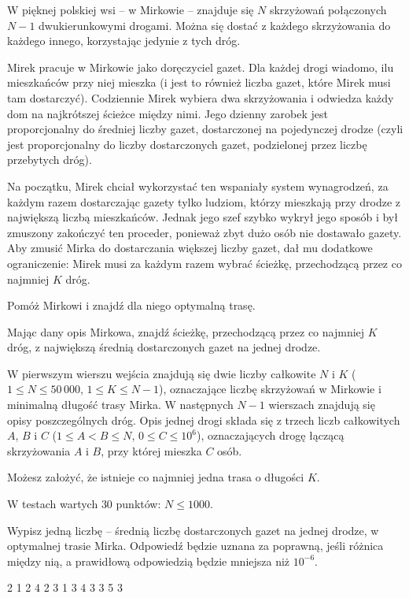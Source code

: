 

\usepackage[utf8]{inputenc}
\usepackage[T1]{fontenc}
\usepackage[polish]{babel}
\usepackage{polski}





W pięknej polskiej wsi -- w Mirkowie -- znajduje się $N$ skrzyżowań
	połączonych $N-1$ dwukierunkowymi drogami.
Można się dostać z każdego skrzyżowania do każdego innego, korzystając jedynie z tych dróg.

Mirek pracuje w Mirkowie jako doręczyciel gazet.
Dla każdej drogi wiadomo, ilu mieszkańców przy niej mieszka
	(i jest to również liczba gazet, które Mirek musi tam dostarczyć).
Codziennie Mirek wybiera dwa skrzyżowania i odwiedza każdy dom na najkrótszej ścieżce między nimi.
Jego dzienny zarobek jest proporcjonalny do średniej liczby gazet, dostarczonej na pojedynczej drodze
	(czyli jest proporcjonalny do liczby dostarczonych gazet, podzielonej przez liczbę przebytych dróg).

Na początku, Mirek chciał wykorzystać ten wspaniały system wynagrodzeń,
	za każdym razem dostarczając gazety tylko ludziom, którzy mieszkają przy drodze
	z największą liczbą mieszkańców.
Jednak jego szef szybko wykrył jego sposób i był zmuszony zakończyć ten proceder,
	ponieważ zbyt dużo osób nie dostawało gazety.
Aby zmusić Mirka do dostarczania większej liczby gazet,
	dał mu dodatkowe ograniczenie: Mirek musi za każdym razem wybrać ścieżkę,
	przechodzącą przez co najmniej $K$ dróg.

Pomóż Mirkowi i znajdź dla niego optymalną trasę.


Mając dany opis Mirkowa, znajdź ścieżkę, przechodzącą przez co najmniej $K$ dróg,
	z największą średnią dostarczonych gazet na jednej drodze.


W pierwszym wierszu wejścia znajdują się dwie liczby całkowite $N$ i $K$ ($1 \le N \le 50\,000$, $1 \le K \le N-1$),
	oznaczające liczbę skrzyżowań w Mirkowie i minimalną długość trasy Mirka.
W następnych $N-1$ wierszach znajdują się opisy poszczególnych dróg.
Opis jednej drogi składa się z trzech liczb całkowitych $A$, $B$ i $C$ ($1 \le A < B \le N$, $0 \le C \le 10^6$),
	oznaczających drogę łączącą skrzyżowania $A$ i $B$, przy której mieszka $C$ osób.

Możesz założyć, że istnieje co najmniej jedna trasa o długości $K$.

W testach wartych $30$ punktów: $N \le 1000$.


Wypisz jedną liczbę -- średnią liczbę dostarczonych gazet na jednej drodze, w optymalnej trasie Mirka.
Odpowiedź będzie uznana za poprawną, jeśli różnica między nią, a prawidłową odpowiedzią będzie mniejsza niż $10^{-6}$.


 2
1 2 4
2 3 1
3 4 3
3 5 3
\sampleEND


